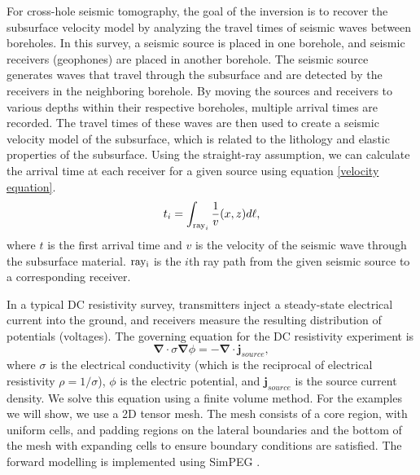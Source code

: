 \documentclass[lettersize,journal]{IEEEtran}
\begin{document}
For cross-hole seismic tomography, the goal of the inversion is to recover the subsurface velocity model by analyzing the travel times of seismic waves between boreholes. In this survey, a seismic source is placed in one borehole, and seismic receivers (geophones) are placed in another borehole. The seismic source generates waves that travel through the subsurface and are detected by the receivers in the neighboring borehole. By moving the sources and receivers to various depths within their respective boreholes, multiple arrival times are recorded. The travel times of these waves are then used to create a seismic velocity model of the subsurface, which is related to the lithology and elastic properties of the subsurface. Using the straight-ray assumption, we can calculate the arrival time at each receiver for a given source using equation \ref{velocity equation}.
\begin{equation}
\label{velocity equation}
t_i = \int_{{\rm ray}_i} \frac{1}{v}(x,z) d\ell,
\end{equation}
where $t$ is the first arrival time and $v$ is the velocity of the seismic wave through the subsurface material. $\rm ray_i$ is the $i$th ray path from the given seismic source to a corresponding receiver.

In a typical DC resistivity survey, transmitters inject a steady-state electrical current into the ground, and receivers measure the resulting distribution of potentials (voltages). The governing equation for the DC resistivity experiment is
\begin{equation}
\label{Poisson equation}
\boldsymbol{\nabla} \cdot \sigma\boldsymbol{\nabla}\phi = -\boldsymbol{\nabla}\cdot\mathbf{j}_{source},
\end{equation}
where $\sigma$ is the electrical conductivity (which is the reciprocal of electrical resistivity $\rho=1/\sigma$), $\phi$ is the electric potential, and $\mathbf{j}_{source}$ is the source current density. We solve this equation using a finite volume method. For the examples we will show, we use a 2D tensor mesh. The mesh consists of a core region, with uniform cells, and padding regions on the lateral boundaries and the bottom of the mesh with expanding cells to ensure boundary conditions are satisfied. The forward modelling is implemented using SimPEG \cite{SimPEG}.  
\end{document}
